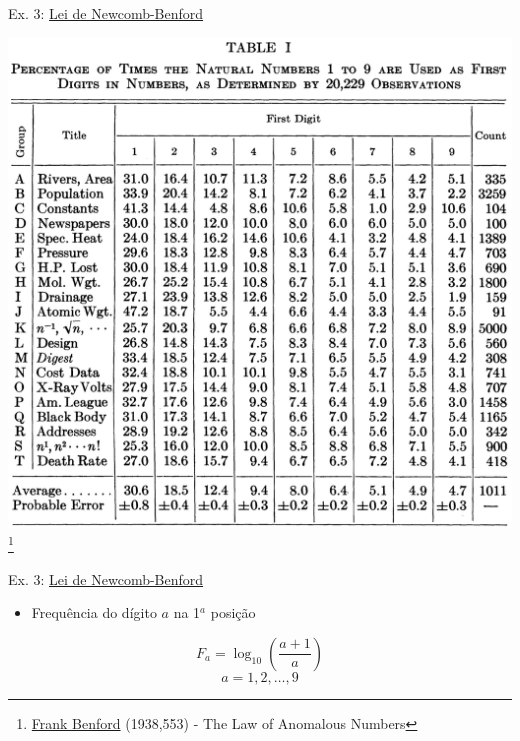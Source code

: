 \documentclass{beamer}\usepackage[]{graphicx}\usepackage[]{xcolor}
\begin{document}
\begin{frame}{Ex. 3: \href{https://en.wikipedia.org/wiki/Benford\%27s_law}{Lei de Newcomb-Benford}}
  \begin{center}
  \includegraphics[scale=0.28]{benford1938.png}\footnote{\tiny{\href{https://en.wikipedia.org/wiki/Frank_Benford}{Frank Benford} (1938,553) - The Law of Anomalous Numbers}}
  \end{center}
\end{frame}

\begin{frame}{Ex. 3: \href{https://en.wikipedia.org/wiki/Benford\%27s_law}{Lei de Newcomb-Benford}}
  \begin{itemize}
    \item Frequência do dígito $a$ na 1$^a$ posição
  \end{itemize}
  \[F_a = \log_{10} \left( \frac{a+1}{a} \right)\]
  \[a=1,2,\ldots,9\]
\end{frame}
\end{document}
